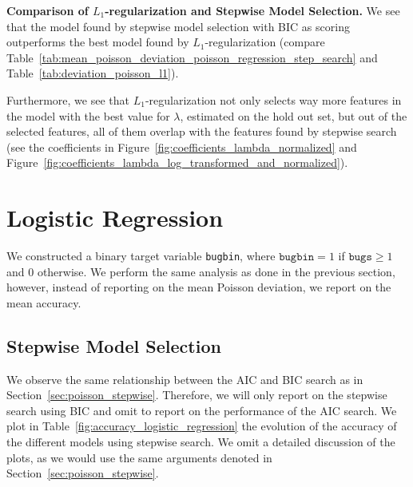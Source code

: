\textbf{Comparison of $L_1$-regularization and Stepwise Model Selection.}
We see that the model found by stepwise model selection with BIC as scoring outperforms the best model found by $L_1$-regularization (compare Table~\ref{tab:mean_poisson_deviation_poisson_regression_step_search} and Table~\ref{tab:deviation_poisson_l1}).

Furthermore, we see that $L_1$-regularization not only selects way more features in the model with the best value for $\lambda$, estimated on the hold out set, but out of the selected features, all of them overlap with the features found by stepwise search (see the coefficients in Figure~\ref{fig:coefficients_lambda_normalized} and Figure~\ref{fig:coefficients_lambda_log_transformed_and_normalized}).

\section{Logistic Regression}

We constructed a binary target variable \texttt{bugbin}, where $\texttt{bugbin}=1$ if $\texttt{bugs}\ge1$ and 0 otherwise. 
We perform the same analysis as done in the previous section, however, instead of reporting on the mean Poisson deviation, we report on the mean accuracy. 




\subsection{Stepwise Model Selection}

We observe the same relationship between the AIC and BIC search as in Section~\ref{sec:poisson_stepwise}.
Therefore, we will only report on the stepwise search using BIC and omit to report on the performance of the AIC search.
We plot in Table~\ref{fig:accuracy_logistic_regression} the evolution of the accuracy of the different models using stepwise search. 
We omit a detailed discussion of the plots, as we would use the same arguments denoted in Section~\ref{sec:poisson_stepwise}.

